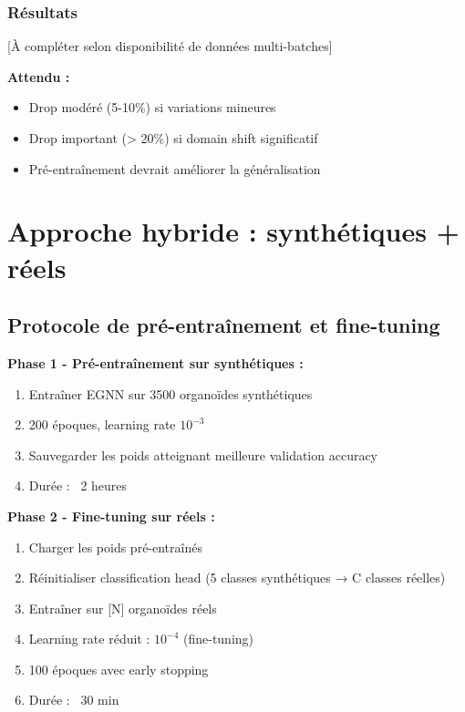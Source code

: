 \subsubsection{Résultats}

[À compléter selon disponibilité de données multi-batches]

\textbf{Attendu :}
\begin{itemize}
    \item Drop modéré (5-10\%) si variations mineures
    \item Drop important (> 20\%) si domain shift significatif
    \item Pré-entraînement devrait améliorer la généralisation
\end{itemize}

\section{Approche hybride : synthétiques + réels}

\subsection{Protocole de pré-entraînement et fine-tuning}

\textbf{Phase 1 - Pré-entraînement sur synthétiques :}
\begin{enumerate}
    \item Entraîner EGNN sur 3500 organoïdes synthétiques
    \item 200 époques, learning rate $10^{-3}$
    \item Sauvegarder les poids atteignant meilleure validation accuracy
    \item Durée : ~2 heures
\end{enumerate}

\textbf{Phase 2 - Fine-tuning sur réels :}
\begin{enumerate}
    \item Charger les poids pré-entraînés
    \item Réinitialiser classification head (5 classes synthétiques → C classes réelles)
    \item Entraîner sur [N] organoïdes réels
    \item Learning rate réduit : $10^{-4}$ (fine-tuning)
    \item 100 époques avec early stopping
    \item Durée : ~30 min
\end{enumerate}


